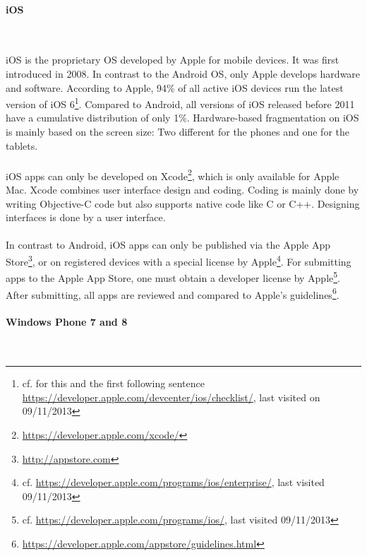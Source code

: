 \paragraph{iOS}$\;$

\vspace{0.75em}
iOS is the proprietary OS developed by Apple for mobile devices. It was first introduced in 2008. In contrast to the Android OS, only Apple develops hardware and software. According to Apple, 94\% of all active iOS devices run the latest version of iOS 6\footnote{cf. for this and the first following sentence \url{https://developer.apple.com/devcenter/ios/checklist/}, last visited on 09/11/2013}. Compared to Android, all versions of iOS released before 2011 have a cumulative distribution of only 1\%. Hardware-based fragmentation on iOS is mainly based on the screen size: Two different for the phones and one for the tablets.
\\
\\
iOS apps can only be developed on Xcode\footnote{\url{https://developer.apple.com/xcode/}}, which is only available for Apple Mac. Xcode combines user interface design and coding. Coding is mainly done by writing Objective-C code but also supports native code like C or C++. Designing interfaces is done by a user interface.
\\
\\
In contrast to Android, iOS apps can only be published via the Apple App Store\footnote{\url{http://appstore.com}}, or on registered devices with a special license by Apple\footnote{cf. \url{https://developer.apple.com/programs/ios/enterprise/}, last visited 09/11/2013}. For submitting apps to the Apple App Store, one must obtain a developer license by Apple\footnote{cf. \url{https://developer.apple.com/programs/ios/}, last visited 09/11/2013}. After submitting, all apps are reviewed and compared to Apple's guidelines\footnote{\url{https://developer.apple.com/appstore/guidelines.html}}.

\paragraph{Windows Phone 7 and 8}$\;$

